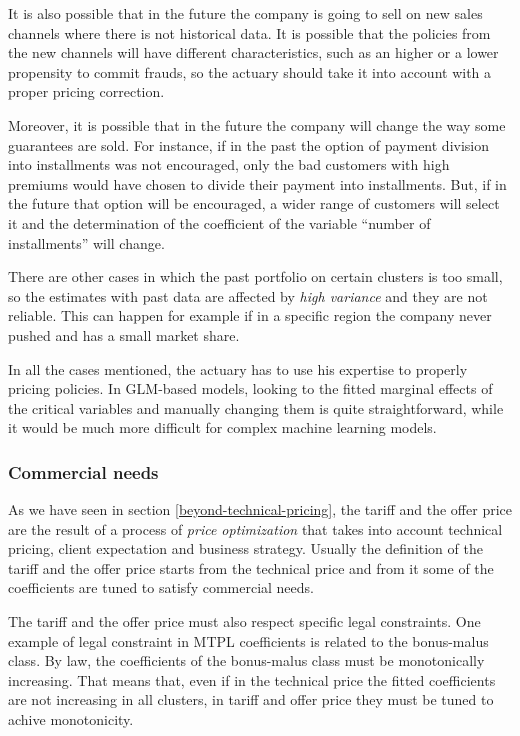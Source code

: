 \documentclass[a4paper, nobind]{templates/ociamthesis}
\theoremstyle{definition}
\theoremstyle{definition}
\theoremstyle{definition}
\theoremstyle{remark}
\begin{document}
It is also possible that in the future the company is going to sell on new sales channels where there is not historical data. It is possible that the policies from the new channels will have different characteristics, such as an higher or a lower propensity to commit frauds, so the actuary should take it into account with a proper pricing correction.

Moreover, it is possible that in the future the company will change the way some guarantees are sold. For instance, if in the past the option of payment division into installments was not encouraged, only the bad customers with high premiums would have chosen to divide their payment into installments. But, if in the future that option will be encouraged, a wider range of customers will select it and the determination of the coefficient of the variable ``number of installments'' will change.

There are other cases in which the past portfolio on certain clusters is too small, so the estimates with past data are affected by \emph{high variance} and they are not reliable. This can happen for example if in a specific region the company never pushed and has a small market share.

In all the cases mentioned, the actuary has to use his expertise to properly pricing policies. In GLM-based models, looking to the fitted marginal effects of the critical variables and manually changing them is quite straightforward, while it would be much more difficult for complex machine learning models.

\hypertarget{commercial-needs}{%
\subsubsection{Commercial needs}\label{commercial-needs}}

As we have seen in section \ref{beyond-technical-pricing}, the tariff and the offer price are the result of a process of \emph{price optimization} that takes into account technical pricing, client expectation and business strategy. Usually the definition of the tariff and the offer price starts from the technical price and from it some of the coefficients are tuned to satisfy commercial needs.

The tariff and the offer price must also respect specific legal constraints. One example of legal constraint in MTPL coefficients is related to the bonus-malus class. By law, the coefficients of the bonus-malus class must be monotonically increasing. That means that, even if in the technical price the fitted coefficients are not increasing in all clusters, in tariff and offer price they must be tuned to achive monotonicity.
\end{document}
